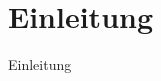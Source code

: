 \documentclass[paper=a4,12pt,titlepage,listof=totoc]{scrartcl}
\begin{document}



{}
\tableofcontents

\clearpage








\section{Einleitung}
Einleitung
\end{document}
